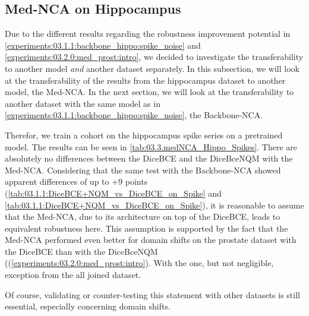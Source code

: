 \subsection{Med-NCA on Hippocampus}
\label{experiments:03.3.0:med_hippo:intro_and_Augmented}
Due to the different results regarding the robustness improvement potential in \autoref{experiments:03.1.1:backbone_hippo:spike_noise} and \autoref{experiments:03.2.0:med_prost:intro}, we decided to investigate the transferability to another model \textit{and} another dataset separately. In this subsection, we will look at the transferability of the results from the hippocampus dataset to another model, the Med-NCA. In the next section, we will look at the transferability to another dataset with the same model as in \autoref{experiments:03.1.1:backbone_hippo:spike_noise}, the Backbone-NCA.

Therefor, we train a cohort on the hippocampus spike series on a pretrained model. The results can be seen in \autoref{tab:03.3.medNCA_Hippo_Spikes}. There are absolutely no differences between the DiceBCE and the DiceBceNQM with the Med-NCA. Considering that the same test with the Backbone-NCA showed apparent differences of up to +9 points (\autoref{tab:03.1.1:DiceBCE+NQM_vs_DiceBCE_on_Spike} and \autoref{tab:03.1.1:DiceBCE+NQM_vs_DiceBCE_on_Spike}), it is reasonable to assume that the Med-NCA, due to its architecture on top of the DiceBCE, leads to equivalent robustness here. This assumption is supported by the fact that the Med-NCA performed even better for domain shifts on the prostate dataset with the DiceBCE than with the DiceBceNQM ((\autoref{experiments:03.2.0:med_prost:intro}). With the one, but not negligible, exception from the all joined dataset.

Of course, validating or counter-testing this statement with other datasets is still essential, especially concerning domain shifts.

\iffalse
mean: 0.0005
mean on absoulte values: 0.0007
sum: 0.018
sum on absoulte values: 0.024
amax: 0.003
amax on absoulte values: 0.003
amin: -0.002
amin on absoulte values: 0.0

==> NO DIFFRENCES AT ALL 
... so it seams, MedNCA outperformces the DiceBceNQM in robustness allready with a diffrent technic or its improved architecture, ... 


mean: 0.0005
mean on absoulte values: 0.0007
sum: 0.018
sum on absoulte values: 0.024
amax: 0.003
amax on absoulte values: 0.003
amin: -0.002
amin on absoulte values: 0.0

==> NO DIFFRENCES AT ALL 
... so it seams, MedNCA outperformces the DiceBceNQM in robustness allready with a diffrent technic or its improved architecture, ... 
\fi
\iftable


\fi